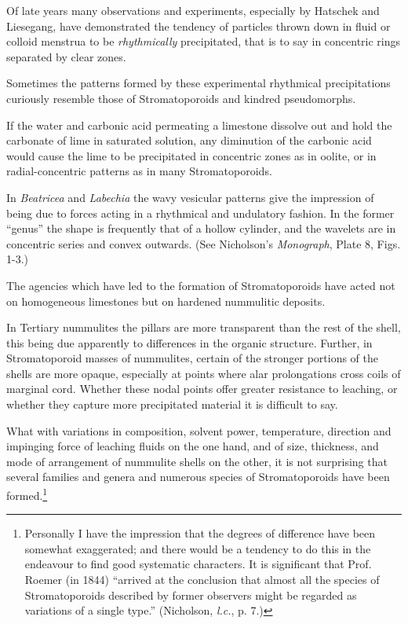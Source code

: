 \documentclass[a4paper, 12pt, oneside]{article}
\begin{document}
Of late years many observations and experiments, especially by Hatschek and Liesegang, have demonstrated the tendency of particles thrown down in fluid or colloid menstrua to be \emph{rhythmically} precipitated, that is to say in concentric rings separated by clear zones.

Sometimes the patterns formed by these experimental rhythmical precipitations curiously resemble those of Stromatoporoids and kindred pseudomorphs.

If the water and carbonic acid permeating a limestone dissolve out and hold the carbonate of lime in saturated solution, any diminution of the carbonic acid would cause the lime to be precipitated in concentric zones as in oolite, or in radial-concentric patterns as in many Stromatoporoids.

In \emph{Beatricea} and \emph{Labechia} the wavy vesicular patterns give the impression of being due to forces acting in a rhythmical and undulatory fashion. In the former ``genus'' the shape is frequently that of a hollow cylinder, and the wavelets are in concentric series and convex outwards. (See Nicholson's \emph{Monograph}, Plate 8, Figs. 1-3.)

The agencies which have led to the formation of Stromatoporoids have acted not on homogeneous limestones but on hardened nummulitic deposits.

In Tertiary nummulites the pillars are more transparent than the rest of the shell, this being due apparently to differences in the organic structure. Further, in Stromatoporoid masses of nummulites, certain of the stronger portions of the shells are more opaque, especially at points where alar prolongations cross coils of marginal cord. Whether these nodal points offer greater resistance to leaching, or whether they capture more precipitated material it is difficult to say.

What with variations in composition, solvent power, temperature, direction and impinging force of leaching fluids on the one hand, and of size, thickness, and mode of arrangement of nummulite shells on the other, it is not surprising that several families and genera and numerous species of Stromatoporoids have been formed.\footnote{Personally I have the impression that the degrees of difference have been somewhat exaggerated; and there would be a tendency to do this in the endeavour to find good systematic characters. It is significant that Prof. Roemer (in 1844) ``arrived at the conclusion that almost all the species of Stromatoporoids described by former observers might be regarded as variations of a single type.'' (Nicholson, \emph{l.c.}, p. 7.)}
\end{document}
